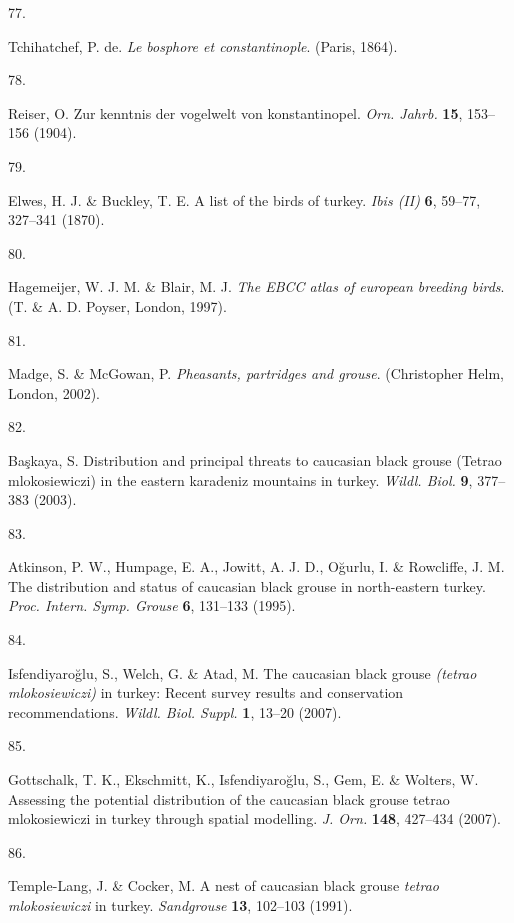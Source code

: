 \documentclass[
  letterpaper,
  DIV=11,
  numbers=noendperiod]{scrreprt}
\newlength{\cslhangindent}
\newlength{\csllabelwidth}
\newenvironment{CSLReferences}[2] %
 {\begin{list}{}{%
  \setlength{\itemindent}{0pt}
  \setlength{\leftmargin}{0pt}
  \setlength{\parsep}{0pt}
  \ifodd #1
   \setlength{\leftmargin}{\cslhangindent}
   \setlength{\itemindent}{-1\cslhangindent}
  \fi
  \setlength{\itemsep}{#2\baselineskip}}}
 {\end{list}}
\newcommand{\CSLLeftMargin}[1]{\parbox[t]{\csllabelwidth}{\strut#1\strut}}
\newcommand{\CSLRightInline}[1]{\parbox[t]{\linewidth - \csllabelwidth}{\strut#1\strut}}
\begin{document}
\begin{CSLReferences}{0}{0}
\CSLLeftMargin{77. }%
\CSLRightInline{Tchihatchef, P. de. \emph{Le bosphore et
constantinople}. (Paris, 1864).}

\CSLLeftMargin{78. }%
\CSLRightInline{Reiser, O. Zur kenntnis der vogelwelt von
konstantinopel. \emph{Orn. Jahrb.} \textbf{15}, 153--156 (1904).}

\CSLLeftMargin{79. }%
\CSLRightInline{Elwes, H. J. \& Buckley, T. E. A list of the birds of
turkey. \emph{Ibis (II)} \textbf{6}, 59--77, 327--341 (1870).}

\CSLLeftMargin{80. }%
\CSLRightInline{Hagemeijer, W. J. M. \& Blair, M. J. \emph{The EBCC
atlas of european breeding birds}. (T. \& A. D. Poyser, London, 1997).}

\CSLLeftMargin{81. }%
\CSLRightInline{Madge, S. \& McGowan, P. \emph{Pheasants, partridges and
grouse}. (Christopher Helm, London, 2002).}

\CSLLeftMargin{82. }%
\CSLRightInline{Başkaya, S. Distribution and principal threats to
caucasian black grouse ({Tetrao mlokosiewiczi}) in the eastern karadeniz
mountains in turkey. \emph{Wildl. Biol.} \textbf{9}, 377--383 (2003).}

\CSLLeftMargin{83. }%
\CSLRightInline{Atkinson, P. W., Humpage, E. A., Jowitt, A. J. D.,
Oğurlu, I. \& Rowcliffe, J. M. The distribution and status of caucasian
black grouse in north-eastern turkey. \emph{Proc. Intern. Symp. Grouse}
\textbf{6}, 131--133 (1995).}

\CSLLeftMargin{84. }%
\CSLRightInline{Isfendiyaroğlu, S., Welch, G. \& Atad, M. The caucasian
black grouse \emph{(tetrao mlokosiewiczi)} in turkey: Recent survey
results and conservation recommendations. \emph{Wildl. Biol. Suppl.}
\textbf{1}, 13--20 (2007).}

\CSLLeftMargin{85. }%
\CSLRightInline{Gottschalk, T. K., Ekschmitt, K., Isfendiyaroğlu, S.,
Gem, E. \& Wolters, W. Assessing the potential distribution of the
caucasian black grouse tetrao mlokosiewiczi in turkey through spatial
modelling. \emph{J. Orn.} \textbf{148}, 427--434 (2007).}

\CSLLeftMargin{86. }%
\CSLRightInline{Temple-Lang, J. \& Cocker, M. A nest of caucasian black
grouse \emph{tetrao mlokosiewiczi} in turkey. \emph{Sandgrouse}
\textbf{13}, 102--103 (1991).}


\end{CSLReferences}
\end{document}
